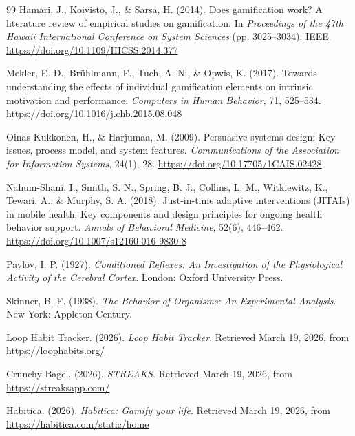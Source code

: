 \begin{thebibliography}{99}
    Hamari, J., Koivisto, J., \& Sarsa, H. (2014). Does gamification work? A literature review of empirical studies on gamification. In \textit{Proceedings of the 47th Hawaii International Conference on System Sciences} (pp. 3025--3034). IEEE. \url{https://doi.org/10.1109/HICSS.2014.377}

    Mekler, E. D., Br\"uhlmann, F., Tuch, A. N., \& Opwis, K. (2017). Towards understanding the effects of individual gamification elements on intrinsic motivation and performance. \textit{Computers in Human Behavior}, 71, 525--534. \url{https://doi.org/10.1016/j.chb.2015.08.048}

    Oinas-Kukkonen, H., \& Harjumaa, M. (2009). Persuasive systems design: Key issues, process model, and system features. \textit{Communications of the Association for Information Systems}, 24(1), 28. \url{https://doi.org/10.17705/1CAIS.02428}

    Nahum-Shani, I., Smith, S. N., Spring, B. J., Collins, L. M., Witkiewitz, K., Tewari, A., \& Murphy, S. A. (2018). Just-in-time adaptive interventions (JITAIs) in mobile health: Key components and design principles for ongoing health behavior support. \textit{Annals of Behavioral Medicine}, 52(6), 446--462. \url{https://doi.org/10.1007/s12160-016-9830-8}

    Pavlov, I. P. (1927). \textit{Conditioned Reflexes: An Investigation of the Physiological Activity of the Cerebral Cortex}. London: Oxford University Press.

    Skinner, B. F. (1938). \textit{The Behavior of Organisms: An Experimental Analysis}. New York: Appleton-Century.

    Loop Habit Tracker. (2026). \textit{Loop Habit Tracker}. Retrieved March 19, 2026, from \url{https://loophabits.org/}

    Crunchy Bagel. (2026). \textit{STREAKS}. Retrieved March 19, 2026, from \url{https://streaksapp.com/}

    Habitica. (2026). \textit{Habitica: Gamify your life}. Retrieved March 19, 2026, from \url{https://habitica.com/static/home}
\end{thebibliography}


